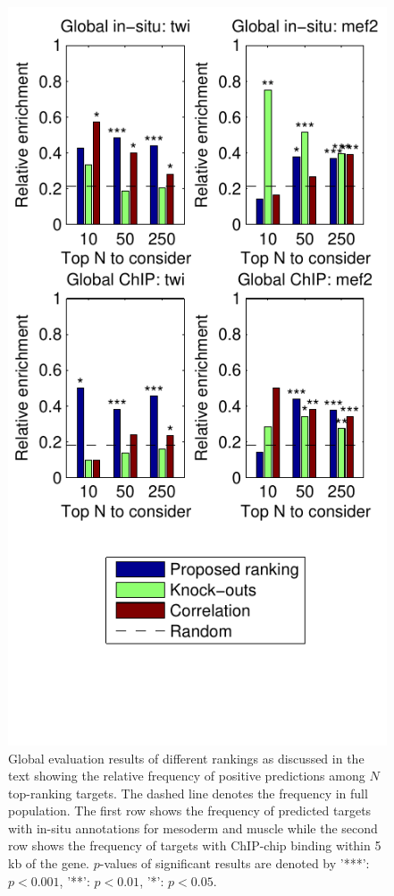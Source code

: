 \documentclass{pnastwo}
\begin{document}
\begin{article}
\begin{figure}[htb]
  \centering
  \includegraphics[trim=0mm 18mm 0mm 0mm]{dros_global_evaluation}
  \caption{Global evaluation results of different rankings as
    discussed in the text showing the relative frequency of positive
    predictions among $N$ top-ranking targets.  The dashed line
    denotes the frequency in full population.  The first row shows the
    frequency of predicted targets with in-situ annotations for
    mesoderm and muscle while the second row shows the frequency of
    targets with ChIP-chip binding within 5 kb of the gene.
    $p$-values of significant results are denoted by '***': $p <
    0.001$, '**': $p < 0.01$, '*': $p < 0.05$.}
  \label{fig:dros_global_evaluation}
\end{figure}


\end{article}
\end{document}

